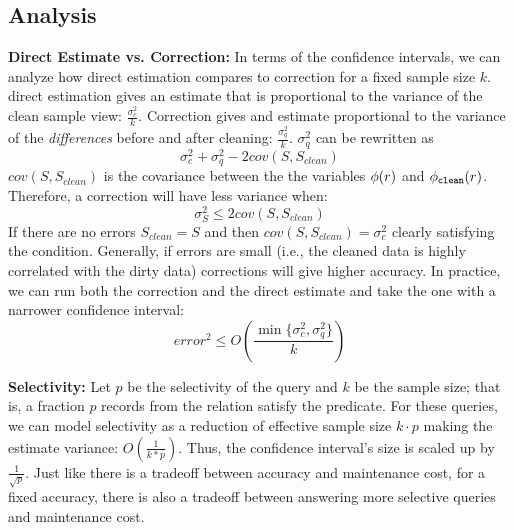 \subsection{Analysis}
\noindent \textbf{Direct Estimate vs. Correction: } In terms of the confidence intervals, we can analyze how direct estimation compares to correction for a fixed sample size $k$.
\sloppy
direct estimation gives an estimate that is proportional to the variance of the clean sample view:  $\frac{\sigma_{c}^2}{k}$.
Correction gives and estimate proportional to the variance of the \emph{differences} before and after cleaning: $\frac{\sigma_{q}^2}{k}$.
$\sigma_{q}^2$ can be rewritten as
\[\sigma_{c}^2 + \sigma_{q}^2 - 2cov(S,S_{clean})\]
$cov(S,S_{clean})$ is the covariance between the the variables $\phi (r)$ and $\phi_{\texttt{clean} } (r)$.
Therefore, a correction will have less variance when:
\[\sigma_{S}^2 \le 2cov(S,S_{clean})\]
If there are no errors $S_{clean} = S$ and then $cov(S,S_{clean})=\sigma_c^2$ clearly satisfying the condition.
Generally, if errors are small (i.e., the cleaned data is highly correlated with the dirty data) corrections will give higher accuracy.
In practice, we can run both the correction and the direct estimate and take the one with a narrower confidence interval:
\begin{equation}
error^2 \le O(\frac{\min\{\sigma_c^2,\sigma_q^2\}}{k})
\end{equation}

\vspace{0.5em}

\noindent \textbf{Selectivity: }
Let $p$ be the selectivity of the query and $k$ be the sample size; that is, a fraction $p$ records from the relation satisfy the predicate.
For these queries, we can model selectivity as a reduction of effective sample size $k\cdot p$ making the
estimate variance: $O(\frac{1}{k*p})$.
Thus, the confidence interval's size is scaled up by $\frac{1}{\sqrt{p}}$.
Just like there is a tradeoff between accuracy and maintenance cost, for a fixed accuracy, 
there is also a tradeoff between answering more selective queries and maintenance cost.

